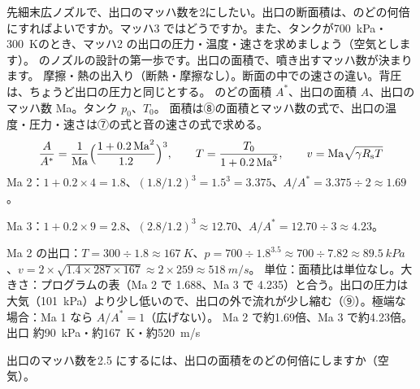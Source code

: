 \begin{phreidai}[ロケットのノズルの出口の大きさ]
\label{ph:熱-4:ex13}先細末広ノズルで、出口のマッハ数を2にしたい。出口の断面積は、のどの何倍にすればよいですか。マッハ3 ではどうですか。また、タンクが\qty{700}{kPa}・\qty{300}{K}のとき、マッハ2 の出口の圧力・温度・速さを求めましょう（空気とします）。
\phbamen
\bkhatenaref のノズルの設計の第一歩です。出口の面積で、噴き出すマッハ数が決まります。
\phmushi
摩擦・熱の出入り（断熱・摩擦なし）。断面の中での速さの違い。背圧は、ちょうど出口の圧力と同じとする。
\phzu
のどの面積 $A^*$、出口の面積 $A$、出口のマッハ数 Ma。タンク $p_0$、$T_0$。
\phriyu
面積は⑧の面積とマッハ数の式で、出口の温度・圧力・速さは⑦の式と音の速さの式で求める。
\phtateru
\[ \frac{A}{A^*}=\frac{1}{\mathrm{Ma}}\Bigl(\frac{1+0.2\,\mathrm{Ma}^2}{1.2}\Bigr)^3,\qquad T=\frac{T_0}{1+0.2\,\mathrm{Ma}^2},\qquad v=\mathrm{Ma}\sqrt{\gamma R_{\mathrm s}T} \]
\phtoku
Ma 2：$1+0.2\times4=1.8$、$(1.8/1.2)^3=1.5^3=3.375$、$A/A^*=3.375\div2\approx1.69$。\par
Ma 3：$1+0.2\times9=2.8$、$(2.8/1.2)^3\approx12.70$、$A/A^*=12.70\div3\approx4.23$。\par
Ma 2 の出口：$T=300\div1.8\approx\qty{167}{K}$、$p=700\div1.8^{3.5}\approx700\div7.82\approx\qty{89.5}{kPa}$、$v=2\times\sqrt{1.4\times287\times167}\approx2\times259\approx\qty{518}{m/s}$。
\phtashikame
単位：面積比は単位なし。大きさ：プログラムの表（Ma 2 で 1.688、Ma 3 で 4.235）と合う。出口の圧力は大気（\qty{101}{kPa}）より少し低いので、出口の外で流れが少し縮む（⑨）。極端な場合：Ma 1 なら $A/A^*=1$（広げない）。
\kotae Ma 2 で約1.69倍、Ma 3 で約4.23倍。出口 約\qty{90}{kPa}・約\qty{167}{K}・約\qty{520}{m/s}
\end{phreidai}
\begin{jibun}
出口のマッハ数を2.5 にするには、出口の面積をのどの何倍にしますか（空気）。
\end{jibun}

